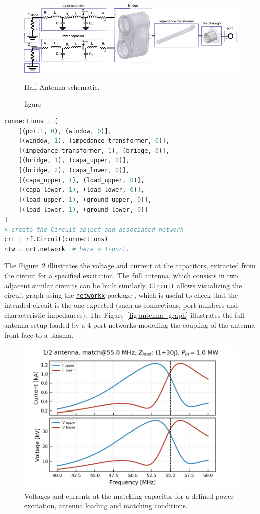 {\begin{figure}
	\centering
	\includegraphics[width=.95\linewidth]{figures/chap3/WEST_ICRH/antenna_circuit}
	\caption{figure}{Half Antenna schematic.}
	\label{fig:antenna_circuit}
\end{figure}

\begin{lstlisting}[language=Python, basicstyle=\footnotesize]
connections = [
	[(port1, 0), (window, 0)],
	[(window, 1), (impedance_transformer, 0)],
	[(impedance_transformer, 1), (bridge, 0)],
	[(bridge, 1), (capa_upper, 0)],
	[(bridge, 2), (capa_lower, 0)],
	[(capa_upper, 1), (load_upper, 0)],
	[(capa_lower, 1), (load_lower, 0)],
	[(load_upper, 1), (ground_upper, 0)],
	[(load_lower, 1), (ground_lower, 0)]
]
# create the Circuit object and associated network
crt = rf.Circuit(connections) 
ntw = crt.network  # here a 1-port.			
\end{lstlisting}

The Figure~\ref{fig:halfantennacurrentvoltage} illustrates the voltage and current at the capacitors, extracted from the circuit for a specified excitation. The full antenna, which consists in two adjacent similar circuits can be built similarly. \texttt{Circuit} allows visualizing the circuit graph using the \href{https://networkx.github.io/}{\texttt{networkx}} package , which is useful to check that the intended circuit is the one expected (such as connections, port numbers and characteristic impedances). The Figure~\ref{fig:antenna_graph} illustrates the full antenna setup loaded by a 4-port networks modelling the coupling of the antenna front-face to a plasma.

\begin{figure}
	\centering
	\includegraphics[width=.95\linewidth]{figures/chap3/WEST_ICRH/half_antenna_current_voltage}
	\caption{Voltages and currents at the matching capacitor for a defined power excitation, antenna loading and matching conditions.}
	\label{fig:halfantennacurrentvoltage}
\end{figure}

}
